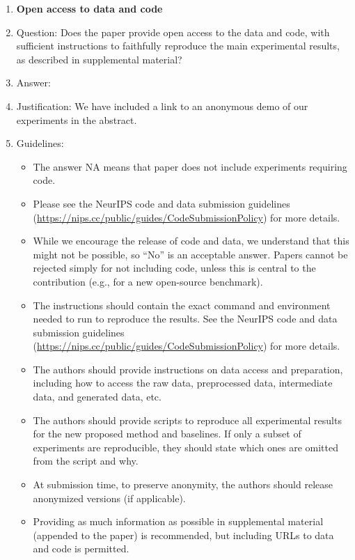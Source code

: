 \documentclass{article}
\begin{document}
\begin{enumerate}
\item {\bf Open access to data and code}
    \item[] Question: Does the paper provide open access to the data and code, with sufficient instructions to faithfully reproduce the main experimental results, as described in supplemental material?
    \item[] Answer: \answerYes{} %
    \item[] Justification: We have included a link to an anonymous demo of our experiments in the abstract.
    \item[] Guidelines:
    \begin{itemize}
        \item The answer NA means that paper does not include experiments requiring code.
        \item Please see the NeurIPS code and data submission guidelines (\url{https://nips.cc/public/guides/CodeSubmissionPolicy}) for more details.
        \item While we encourage the release of code and data, we understand that this might not be possible, so “No” is an acceptable answer. Papers cannot be rejected simply for not including code, unless this is central to the contribution (e.g., for a new open-source benchmark).
        \item The instructions should contain the exact command and environment needed to run to reproduce the results. See the NeurIPS code and data submission guidelines (\url{https://nips.cc/public/guides/CodeSubmissionPolicy}) for more details.
        \item The authors should provide instructions on data access and preparation, including how to access the raw data, preprocessed data, intermediate data, and generated data, etc.
        \item The authors should provide scripts to reproduce all experimental results for the new proposed method and baselines. If only a subset of experiments are reproducible, they should state which ones are omitted from the script and why.
        \item At submission time, to preserve anonymity, the authors should release anonymized versions (if applicable).
        \item Providing as much information as possible in supplemental material (appended to the paper) is recommended, but including URLs to data and code is permitted.
    \end{itemize}



\end{enumerate}
\end{document}

